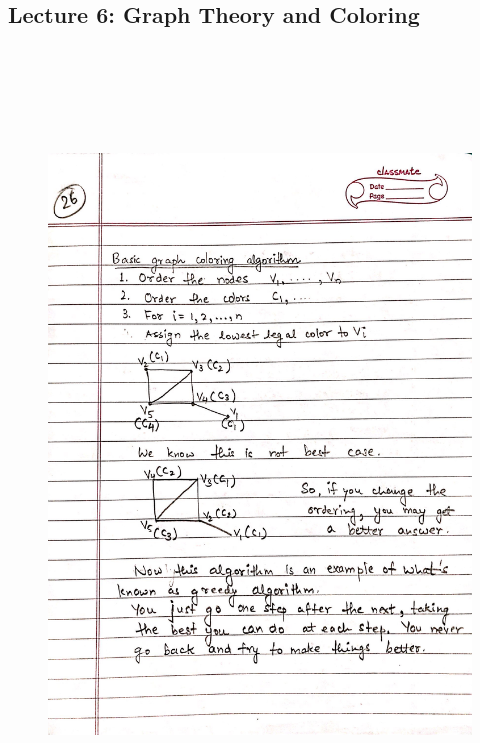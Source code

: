 \newpage
{\color{black} \subsection*{Lecture 6: Graph Theory and Coloring}}
\begin{figure}[H]
    \centering
    \includegraphics[width=16cm, height=21cm]{"./MIT-6.042J/MIT-6042J-026"}
\end{figure}

